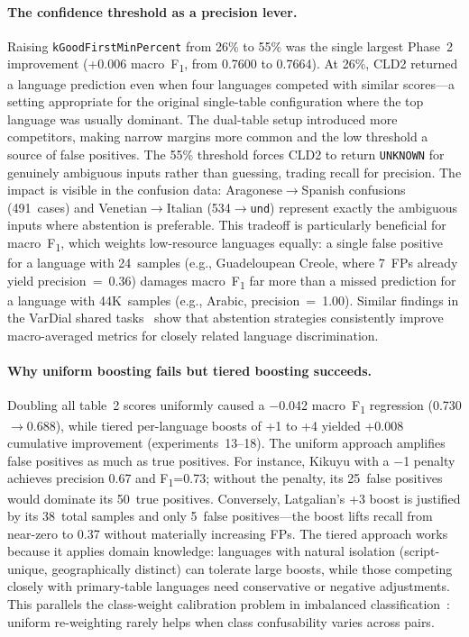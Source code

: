 \documentclass{article}
\newcommand{\fone}{F\textsubscript{1}}
\begin{document}
\paragraph{The confidence threshold as a precision lever.}
Raising \texttt{kGoodFirstMinPercent} from 26\% to 55\% was the single largest Phase~2 improvement (+0.006 macro~\fone{}, from 0.7600 to 0.7664).
At 26\%, CLD2 returned a language prediction even when four languages competed with similar scores---a setting appropriate for the original single-table configuration where the top language was usually dominant.
The dual-table setup introduced more competitors, making narrow margins more common and the low threshold a source of false positives.
The 55\% threshold forces CLD2 to return \texttt{UNKNOWN} for genuinely ambiguous inputs rather than guessing, trading recall for precision.
The impact is visible in the confusion data: Aragonese$\to$Spanish confusions (491~cases) and Venetian$\to$Italian (534$\to$\texttt{und}) represent exactly the ambiguous inputs where abstention is preferable.
This tradeoff is particularly beneficial for macro~\fone{}, which weights low-resource languages equally: a single false positive for a language with 24~samples (e.g., Guadeloupean Creole, where 7~FPs already yield precision~=~0.36) damages macro~\fone{} far more than a missed prediction for a language with 44K~samples (e.g., Arabic, precision~=~1.00).
Similar findings in the VarDial shared tasks~\citep{zampieri-etal-2017-findings} show that abstention strategies consistently improve macro-averaged metrics for closely related language discrimination.

\paragraph{Why uniform boosting fails but tiered boosting succeeds.}
Doubling all table~2 scores uniformly caused a $-$0.042 macro~\fone{} regression (0.730$\to$0.688), while tiered per-language boosts of +1 to +4 yielded +0.008 cumulative improvement (experiments~13--18).
The uniform approach amplifies false positives as much as true positives.
For instance, Kikuyu with a $-$1 penalty achieves precision 0.67 and \fone{}=0.73; without the penalty, its 25~false positives would dominate its 50~true positives.
Conversely, Latgalian's +3 boost is justified by its 38~total samples and only 5~false positives---the boost lifts recall from near-zero to 0.37 without materially increasing FPs.
The tiered approach works because it applies domain knowledge: languages with natural isolation (script-unique, geographically distinct) can tolerate large boosts, while those competing closely with primary-table languages need conservative or negative adjustments.
This parallels the class-weight calibration problem in imbalanced classification~\citep{lui-cook-2013-classifier}: uniform re-weighting rarely helps when class confusability varies across pairs.
\end{document}
